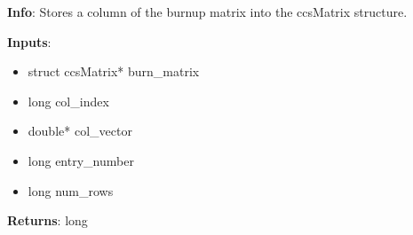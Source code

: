 \textbf{Info}: Stores a column of the burnup matrix into the ccsMatrix
structure.

\noindent \textbf{Inputs}:
\begin{itemize}
\item{struct ccsMatrix* burn\_matrix}
\item{long col\_index}
\item{double* col\_vector}
\item{long entry\_number}
\item{long num\_rows}
\end{itemize}

\noindent \textbf{Returns}: long
